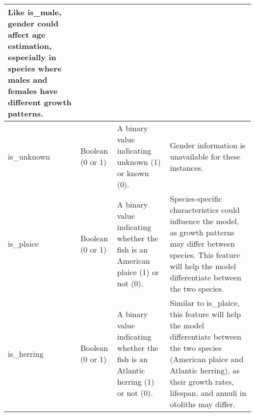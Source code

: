 \begin{longtable}{| p{} | p{} | p{} | p{} |}
    Like is\_male, gender could affect age estimation, especially in species where males and females have different growth patterns. \\
    \hline
    is\_unknown &
    Boolean (0 or 1) &
    A binary value indicating unknown (1) or known (0). &
    Gender information is unavailable for these instances. \\
    \hline
    is\_plaice &
    Boolean (0 or 1) &
    A binary value indicating whether the fish is an American plaice (1) or not (0). &
    Species-specific characteristics could influence the model, as growth patterns may differ between species.
    This feature will help the model differentiate between the two species. \\
    \hline
    is\_herring &
    Boolean (0 or 1) &
    A binary value indicating whether the fish is an Atlantic herring (1) or not (0). &
    Similar to is\_plaice, this feature will help the model differentiate between the two species (American plaice and Atlantic herring), as their growth rates, lifespan, and annuli in otoliths may differ. \\
    \hline


\end{longtable}
